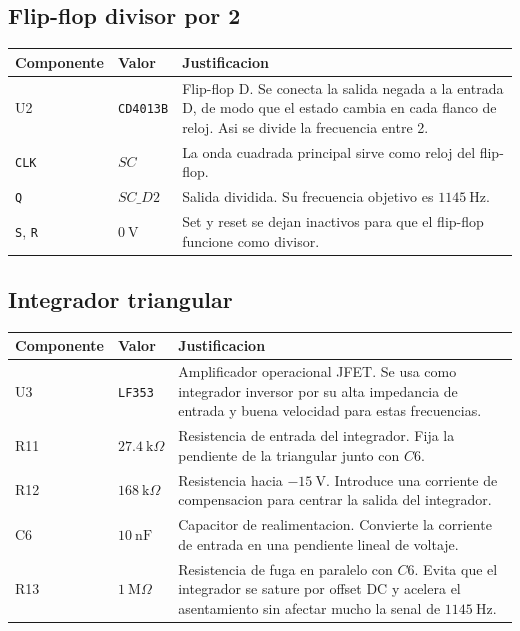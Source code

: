 ﻿\documentclass[11pt,letterpaper]{article}
\newcommand{\kohm}{\text{k}\Omega}
\newcommand{\Mohm}{\text{M}\Omega}
\begin{document}
\subsection{Flip-flop divisor por 2}

\begin{longtable}{p{2.0cm}p{4.2cm}p{8.7cm}}
\toprule
Componente & Valor & Justificacion \\
\midrule
\endhead
U2 & \texttt{CD4013B} & Flip-flop D. Se conecta la salida negada a la entrada
D, de modo que el estado cambia en cada flanco de reloj. Asi se divide la
frecuencia entre 2. \\
\texttt{CLK} & \(SC\) & La onda cuadrada principal sirve como reloj del
flip-flop. \\
\texttt{Q} & \(SC\_D2\) & Salida dividida. Su frecuencia objetivo es
\(1145~\text{Hz}\). \\
\texttt{S}, \texttt{R} & \(0~\text{V}\) & Set y reset se dejan inactivos para
que el flip-flop funcione como divisor. \\
\bottomrule
\end{longtable}

\subsection{Integrador triangular}

\begin{longtable}{p{2.0cm}p{4.2cm}p{8.7cm}}
\toprule
Componente & Valor & Justificacion \\
\midrule
\endhead
U3 & \texttt{LF353} & Amplificador operacional JFET. Se usa como integrador
inversor por su alta impedancia de entrada y buena velocidad para estas
frecuencias. \\
R11 & \(27.4~\kohm\) & Resistencia de entrada del integrador. Fija la
pendiente de la triangular junto con \(C6\). \\
R12 & \(168~\kohm\) & Resistencia hacia \(-15~\text{V}\). Introduce una
corriente de compensacion para centrar la salida del integrador. \\
C6 & \(10~\text{nF}\) & Capacitor de realimentacion. Convierte la corriente de
entrada en una pendiente lineal de voltaje. \\
R13 & \(1~\Mohm\) & Resistencia de fuga en paralelo con \(C6\). Evita que el
integrador se sature por offset DC y acelera el asentamiento sin afectar mucho
la senal de \(1145~\text{Hz}\). \\
\bottomrule
\end{longtable}
\end{document}
